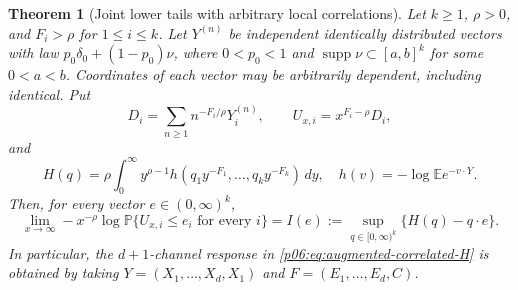 \documentclass[11pt,letterpaper]{article}
\newtheorem{theorem}{Theorem}[section]
\theoremstyle{definition}
\theoremstyle{remark}
\newcommand{\1}{\mathbf 1}
\begin{document}
\begin{theorem}[Joint lower tails with arbitrary local correlations]
\label{p06:thm:correlated-array-ldp}
Let $k\ge1$, $\rho>0$, and $F_i>\rho$ for $1\le i\le k$.
Let $Y^{(n)}$ be independent identically distributed vectors with law
$p_0\delta_0+(1-p_0)\nu$, where $0<p_0<1$ and
$\operatorname{supp}\nu\subset[a,b]^k$ for some $0<a<b$.
Coordinates of each vector may be arbitrarily dependent, including
identical. Put
\[
 D_i=\sum_{n\ge1}n^{-F_i/\rho}Y_i^{(n)},\qquad
 U_{x,i}=x^{F_i-\rho}D_i,
\]
and
\[
 H(q)=\rho\int_0^\infty y^{\rho-1}
       h(q_1y^{-F_1},\ldots,q_ky^{-F_k})\,dy,
 \quad h(v)=-\log\mathbb E e^{-v\cdot Y}.
\]
Then, for every vector $e\in(0,\infty)^k$,
\begin{equation}\label{p06:eq:correlated-lower-tail-ldp}
 \lim_{x\to\infty}-x^{-\rho}
 \log\mathbb P\{U_{x,i}\le e_i\text{ for every }i\}
 =I(e):=\sup_{q\in[0,\infty)^k}\{H(q)-q\cdot e\}.
\end{equation}
In particular, the $d+1$-channel response in
\eqref{p06:eq:augmented-correlated-H} is obtained by taking
$Y=(X_1,\ldots,X_d,X_1)$ and $F=(E_1,\ldots,E_d,C)$.
\end{theorem}
\end{document}
